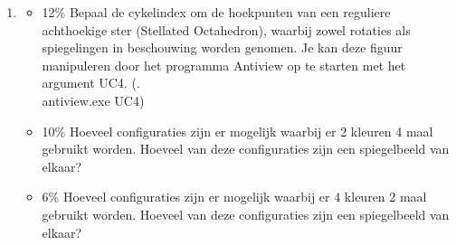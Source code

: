 \documentclass{article}
\def\note#1{\color{cyan} #1 \color{black}}
\begin{document}
\begin{enumerate}
  \item {\begin{itemize}
      \item {\note{12\%} Bepaal de cykelindex om de hoekpunten van een reguliere achthoekige ster (Stellated Octahedron), waarbij zowel rotaties als spiegelingen in beschouwing worden genomen. Je kan deze figuur manipuleren door het programma Antiview op te starten met het argument UC4. (.\\antiview.exe UC4)}
      \item {\note{10\%} Hoeveel configuraties zijn er mogelijk waarbij er 2 kleuren 4 maal gebruikt worden. Hoeveel van deze configuraties zijn een spiegelbeeld van elkaar?}
        \item {\note{6\%} Hoeveel configuraties zijn er mogelijk waarbij er 4 kleuren 2 maal gebruikt worden. Hoeveel van deze configuraties zijn een spiegelbeeld van elkaar?}
      \end{itemize}}
\end{enumerate}
\end{document}
